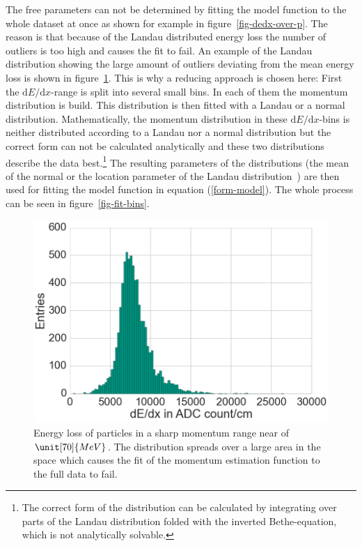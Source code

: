 The free parameters can not be determined by fitting the model function to the whole dataset at once as shown for example in figure~\ref{fig-dedx-over-p}. The reason is that because of the Landau distributed energy loss the number of outliers is too high and causes the fit to fail. An example of the Landau distribution showing the large amount of outliers deviating from the mean energy loss is shown in figure~\ref{fig-landau}. This is why a reducing approach is chosen here: First the $\mathrm d E / \mathrm d x$-range is split into several small bins. In each of them the momentum distribution is build. This distribution is then fitted with a Landau or a normal distribution. Mathematically, the momentum distribution in these $\mathrm d E / \mathrm d x$-bins is neither distributed according to a Landau nor a normal distribution but the correct form can not be calculated analytically and these two distributions describe the data best.\footnote{The correct form of the distribution can be calculated by integrating over parts of the Landau distribution folded with the inverted Bethe-equation, which is not analytically solvable.} The resulting parameters of the distributions (the mean of the normal or the location parameter of the Landau distribution~\cite{landau}) are then used for fitting the model function in equation (\ref{form-model}). The whole process can be seen in figure~\ref{fig-fit-bins}.

\begin{figure}
  \centering
  \includegraphics[width=0.7\linewidth]{figures/vxd/landau.png}
  \caption[Energy loss of particles in a sharp momentum range near of 70 MeV.]{Energy loss of particles in a sharp momentum range near of $\unit[70]{MeV}$. The distribution spreads over a large area in the \dedx space which causes the fit of the momentum estimation function to the full data to fail.}
  \label{fig-landau}
\end{figure}

